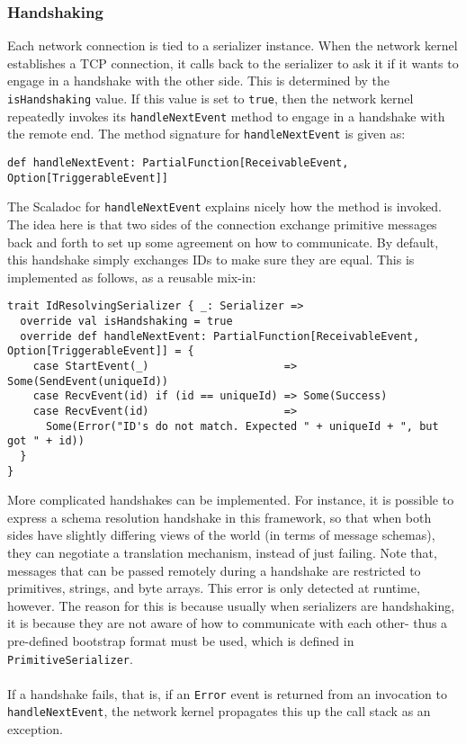 \documentclass{article}
\begin{document}
\subsubsection{Handshaking}
Each network connection is tied to a serializer instance. 
When the network kernel establishes a TCP connection, it calls back to the serializer to ask it if
it wants to engage in a handshake with the other side. This is determined by the
\verb|isHandshaking| value. If this value is set to \verb|true|, then the
network kernel repeatedly invokes its \verb|handleNextEvent| method to engage in a handshake
with the remote end. The method signature for \verb|handleNextEvent| is given as:
\begin{verbatim}
def handleNextEvent: PartialFunction[ReceivableEvent, Option[TriggerableEvent]]
\end{verbatim}
The Scaladoc for \verb|handleNextEvent| explains nicely how the method is invoked.
The idea here is that two sides of the connection exchange primitive messages back and forth
to set up some agreement on how to communicate. By default, this handshake simply exchanges
IDs to make sure they are equal. This is implemented as follows, as a reusable mix-in:
\begin{verbatim}
trait IdResolvingSerializer { _: Serializer =>
  override val isHandshaking = true        
  override def handleNextEvent: PartialFunction[ReceivableEvent, Option[TriggerableEvent]] = {                        
    case StartEvent(_)                     => Some(SendEvent(uniqueId))
    case RecvEvent(id) if (id == uniqueId) => Some(Success)                                                           
    case RecvEvent(id)                     => 
      Some(Error("ID's do not match. Expected " + uniqueId + ", but got " + id))     
  }                                                                                                                   
}
\end{verbatim}
More complicated handshakes can be implemented. For instance, it is possible to
express a schema resolution handshake in this framework, so that when both sides
have slightly differing views of the world (in terms of message schemas), they 
can negotiate a translation mechanism, instead of just failing. Note that,
messages that can be passed remotely during a handshake are restricted to primitives,
strings, and byte arrays. This error is only detected at runtime, however. The
reason for this is because usually when serializers are handshaking, it is because
they are not aware of how to communicate with each other- thus a pre-defined bootstrap
format must be used, which is defined in \verb|PrimitiveSerializer|. \\ \\
If a handshake fails, that is, if an \verb|Error| event is returned from
an invocation to \verb|handleNextEvent|, the network kernel propagates this up the
call stack as an exception.
\end{document}
